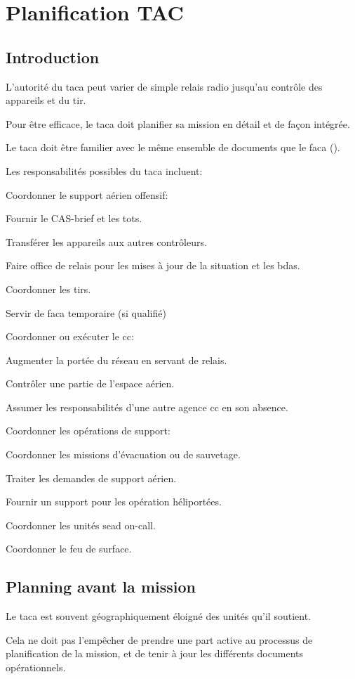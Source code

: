 \section{Planification TAC}

\subsection{Introduction}

L'autorité du \gls{taca} peut varier de simple relais radio jusqu'au contrôle des appareils et du tir.

Pour être efficace, le \gls{taca} doit planifier sa mission en détail et de façon intégrée.

Le \gls{taca} doit être familier avec le même ensemble de documents que le \gls{faca} ().

Les responsabilités possibles du \gls{taca} incluent:

\begin{e1}
	\item Coordonner le support aérien offensif:
	\begin{e2}
		\item Fournir le CAS-brief et les \glspl{tot}.
		\item Transférer les appareils aux autres contrôleurs.
		\item Faire office de relais pour les mises à jour de la situation et les \glspl{bda}.
		\item Coordonner les tirs.
		\item Servir de \gls{faca} temporaire (si qualifié)
	\end{e2}
	\item Coordonner ou exécuter le \gls{cc}:
	\begin{e2}
		\item Augmenter la portée du réseau en servant de relais.
		\item Contrôler une partie de l'espace aérien.
		\item Assumer les responsabilités d'une autre agence \gls{cc} en son absence.
	\end{e2}
	\item Coordonner les opérations de support:
	\begin{e2}
		\item Coordonner les missions d'évacuation ou de sauvetage.
		\item Traiter les demandes de support aérien.
		\item Fournir un support pour les opération héliportées.
		\item Coordonner les unités \gls{sead} on-call.
		\item Coordonner le feu de surface.
	\end{e2}
\end{e1}

\subsection{Planning avant la mission}

Le \gls{taca} est souvent géographiquement éloigné des unités qu'il soutient.

Cela ne doit pas l'empêcher de prendre une part active au processus de planification de la mission, et de tenir à jour les différents documents opérationnels.